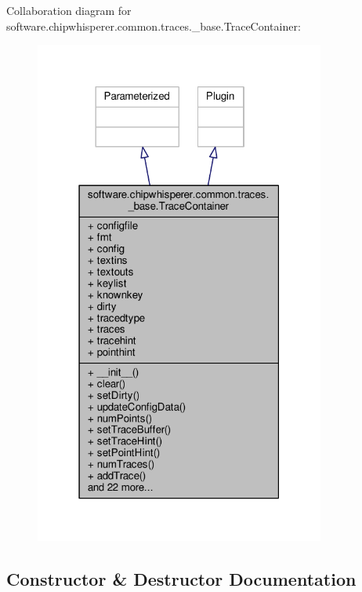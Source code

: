 Collaboration diagram for software.\+chipwhisperer.\+common.\+traces.\+\_\+base.\+Trace\+Container\+:\nopagebreak
\begin{figure}[H]
\begin{center}
\leavevmode
\includegraphics[width=271pt]{d1/dae/classsoftware_1_1chipwhisperer_1_1common_1_1traces_1_1__base_1_1TraceContainer__coll__graph}
\end{center}
\end{figure}


\subsection{Constructor \& Destructor Documentation}
\hypertarget{classsoftware_1_1chipwhisperer_1_1common_1_1traces_1_1__base_1_1TraceContainer_a609ec03e29de777f02cda2956661bce8}{}

